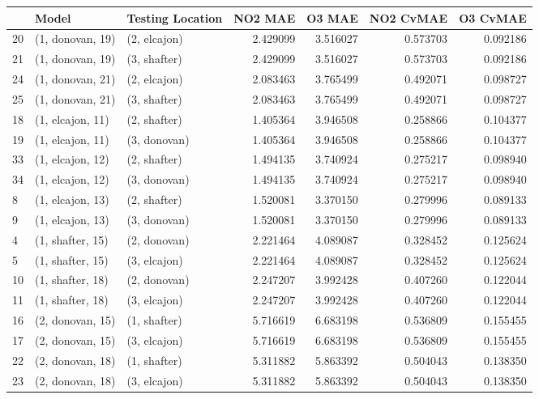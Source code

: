 \begin{tabular}{lllrrrr}
\toprule
{} &             Model & Testing Location &   NO2 MAE &    O3 MAE &  NO2 CvMAE &  O3 CvMAE \\
\midrule
20 &  (1, donovan, 19) &     (2, elcajon) &  2.429099 &  3.516027 &   0.573703 &  0.092186 \\
21 &  (1, donovan, 19) &     (3, shafter) &  2.429099 &  3.516027 &   0.573703 &  0.092186 \\
24 &  (1, donovan, 21) &     (2, elcajon) &  2.083463 &  3.765499 &   0.492071 &  0.098727 \\
25 &  (1, donovan, 21) &     (3, shafter) &  2.083463 &  3.765499 &   0.492071 &  0.098727 \\
18 &  (1, elcajon, 11) &     (2, shafter) &  1.405364 &  3.946508 &   0.258866 &  0.104377 \\
19 &  (1, elcajon, 11) &     (3, donovan) &  1.405364 &  3.946508 &   0.258866 &  0.104377 \\
33 &  (1, elcajon, 12) &     (2, shafter) &  1.494135 &  3.740924 &   0.275217 &  0.098940 \\
34 &  (1, elcajon, 12) &     (3, donovan) &  1.494135 &  3.740924 &   0.275217 &  0.098940 \\
8  &  (1, elcajon, 13) &     (2, shafter) &  1.520081 &  3.370150 &   0.279996 &  0.089133 \\
9  &  (1, elcajon, 13) &     (3, donovan) &  1.520081 &  3.370150 &   0.279996 &  0.089133 \\
4  &  (1, shafter, 15) &     (2, donovan) &  2.221464 &  4.089087 &   0.328452 &  0.125624 \\
5  &  (1, shafter, 15) &     (3, elcajon) &  2.221464 &  4.089087 &   0.328452 &  0.125624 \\
10 &  (1, shafter, 18) &     (2, donovan) &  2.247207 &  3.992428 &   0.407260 &  0.122044 \\
11 &  (1, shafter, 18) &     (3, elcajon) &  2.247207 &  3.992428 &   0.407260 &  0.122044 \\
16 &  (2, donovan, 15) &     (1, shafter) &  5.716619 &  6.683198 &   0.536809 &  0.155455 \\
17 &  (2, donovan, 15) &     (3, elcajon) &  5.716619 &  6.683198 &   0.536809 &  0.155455 \\
22 &  (2, donovan, 18) &     (1, shafter) &  5.311882 &  5.863392 &   0.504043 &  0.138350 \\
23 &  (2, donovan, 18) &     (3, elcajon) &  5.311882 &  5.863392 &   0.504043 &  0.138350 \\

\end{tabular}
